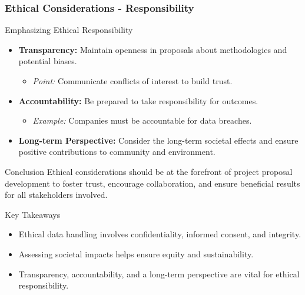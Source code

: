 \documentclass[aspectratio=169]{beamer}
\begin{document}
\begin{frame}[fragile]
    \frametitle{Ethical Considerations - Responsibility}
    \begin{block}{Emphasizing Ethical Responsibility}
        \begin{itemize}
            \item \textbf{Transparency:} Maintain openness in proposals about methodologies and potential biases.
                \begin{itemize}
                    \item \textit{Point:} Communicate conflicts of interest to build trust.
                \end{itemize}
                
            \item \textbf{Accountability:} Be prepared to take responsibility for outcomes.
                \begin{itemize}
                    \item \textit{Example:} Companies must be accountable for data breaches.
                \end{itemize}
                
            \item \textbf{Long-term Perspective:} Consider the long-term societal effects and ensure positive contributions to community and environment.
        \end{itemize}
    \end{block}

    \begin{block}{Conclusion}
        Ethical considerations should be at the forefront of project proposal development to foster trust, encourage collaboration, and ensure beneficial results for all stakeholders involved.
    \end{block}
    
    \begin{block}{Key Takeaways}
        \begin{itemize}
            \item Ethical data handling involves confidentiality, informed consent, and integrity.
            \item Assessing societal impacts helps ensure equity and sustainability.
            \item Transparency, accountability, and a long-term perspective are vital for ethical responsibility.
        \end{itemize}
    \end{block}
\end{frame}
\end{document}
